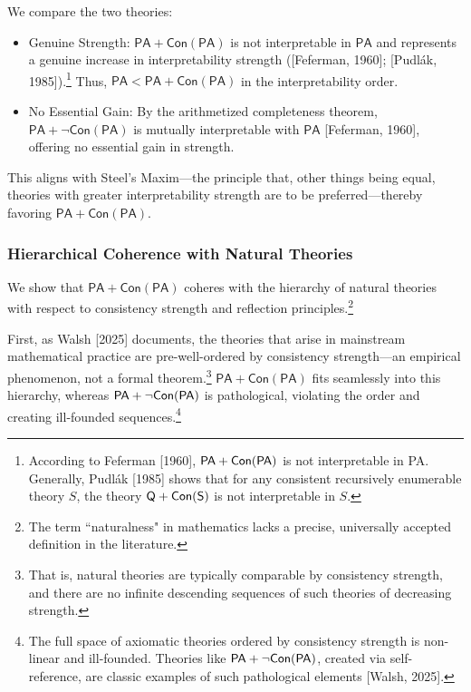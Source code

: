 \documentclass[a4paper,12pt]{amsart}
\theoremstyle{definition}
\numberwithin{equation}{section}
\begin{document}
We compare the two theories:
\begin{itemize}
  \item Genuine Strength: $\mathsf{PA} + \mathsf{Con(PA)}$ is not interpretable in $\mathsf{PA}$ and represents a genuine increase in interpretability strength ([Feferman, 1960]; [Pudl\'{a}k, 1985]).\footnote{According to Feferman [1960], ${\sf PA}+ \sf Con(PA)$ is not interpretable in {\sf PA}. Generally, Pudl\'{a}k [1985] shows that for any consistent recursively enumerable theory $S$, the theory ${\sf Q} + \sf Con(S)$ is not interpretable in $S$.} Thus, $\mathsf{PA} < \mathsf{PA} + \mathsf{Con(PA)}$ in the interpretability order.
  \item No Essential Gain: By the arithmetized completeness theorem, $\mathsf{PA} + \neg \mathsf{Con(PA)}$ is mutually interpretable with $\mathsf{PA}$ [Feferman, 1960], offering no essential gain in strength.
\end{itemize}

This aligns with Steel's Maxim—the principle that, other things being equal, theories with greater interpretability strength are to be preferred—thereby favoring $\mathsf{PA} + \mathsf{Con(PA)}$. 


\subsubsection{Hierarchical Coherence with Natural Theories}


We show that $\mathsf{PA} + \mathsf{Con(PA)}$  coheres with the hierarchy of natural theories with respect to consistency strength and reflection principles.\footnote{The term ``naturalness" in mathematics lacks a precise, universally accepted definition in the literature.}

First, as Walsh [2025] documents, the theories that arise in mainstream mathematical practice are pre-well-ordered by consistency strength---an empirical phenomenon, not a formal theorem.\footnote{That is, natural theories are typically comparable by consistency strength, and there are no infinite descending sequences of such theories of decreasing strength.} $\mathsf{PA} + \mathsf{Con(PA)}$  fits seamlessly into this hierarchy, whereas $\sf PA + \neg Con(PA)$ is pathological, violating the order and creating ill-founded sequences.\footnote{The full space of axiomatic theories ordered by consistency strength is non-linear and ill-founded. Theories like $\sf PA + \neg Con(PA)$, created via self-reference, are classic examples of such pathological elements [Walsh, 2025].}
 
\end{document}
